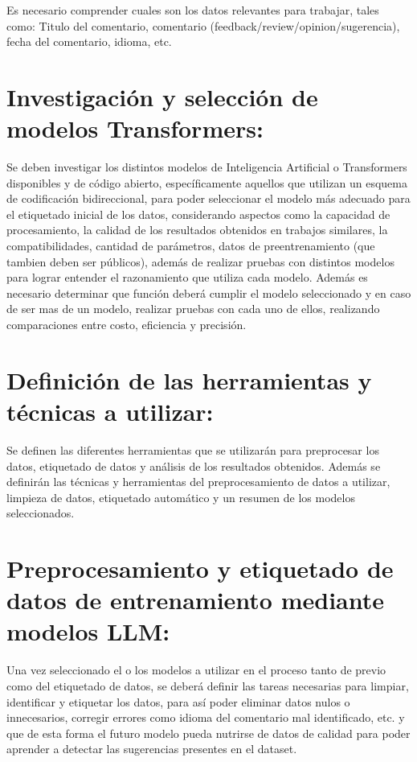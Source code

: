 Es necesario comprender cuales son los datos relevantes para trabajar, tales como: Titulo del comentario, comentario (feedback/review/opinion/sugerencia), fecha del comentario, idioma, etc.

\section{\textbf{Investigación y selección de modelos Transformers:}}

Se deben investigar los distintos modelos de Inteligencia Artificial o Transformers disponibles y de código abierto, específicamente aquellos que utilizan un esquema de codificación bidireccional, para poder seleccionar el modelo más adecuado para el etiquetado inicial de los datos, considerando aspectos como la capacidad de procesamiento, la calidad de los resultados obtenidos en trabajos similares, la compatibilidades, cantidad de parámetros, datos de preentrenamiento (que tambien deben ser públicos), además de realizar pruebas con distintos modelos para lograr entender el razonamiento que utiliza cada modelo. Además es necesario determinar que función deberá cumplir el modelo seleccionado y en caso de ser mas de un modelo, realizar pruebas con cada uno de ellos, realizando comparaciones entre costo, eficiencia y precisión.

\section{\textbf{Definición de las herramientas y técnicas a utilizar:}}

Se definen las diferentes herramientas que se utilizarán para preprocesar los datos, etiquetado de datos y análisis de los resultados obtenidos. Además se definirán las técnicas y herramientas del preprocesamiento de datos a utilizar, limpieza de datos, etiquetado automático y un resumen de los modelos seleccionados.

\section{\textbf{Preprocesamiento y etiquetado de datos de entrenamiento mediante modelos LLM:}}

Una vez seleccionado el o los modelos a utilizar en el proceso tanto de previo como del etiquetado de datos, se deberá definir las tareas necesarias para limpiar, identificar y etiquetar los datos, para así poder eliminar datos nulos o innecesarios, corregir errores como idioma del comentario mal identificado, etc. y que de esta forma el futuro modelo pueda nutrirse de datos de calidad para poder aprender a detectar las sugerencias presentes en el dataset.

